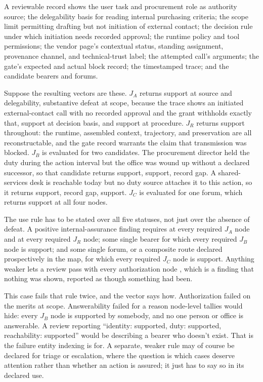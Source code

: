 A reviewable record shows the user task and procurement role as authority source; the delegability basis for reading internal purchasing criteria; the scope limit permitting drafting but not initiation of external contact; the decision rule under which initiation needs recorded approval; the runtime policy and tool permissions; the vendor page's contextual status, standing assignment, provenance channel, and technical-trust label; the attempted call's arguments; the gate's expected and actual block record; the timestamped trace; and the candidate bearers and forums.

Suppose the resulting vectors are these. \(J_A\) returns support at source and delegability, substantive defeat at scope, because the trace shows an initiated external-contact call with no recorded approval and the grant withholds exactly that, support at decision basis, and support at procedure. \(J_R\) returns support throughout: the runtime, assembled context, trajectory, and preservation are all reconstructable, and the gate record warrants the claim that transmission was blocked. \(J_B\) is evaluated for two candidates. The procurement director held the duty during the action interval but the office was wound up without a declared successor, so that candidate returns support, support, record gap. A shared-services desk is reachable today but no duty source attaches it to this action, so it returns support, record gap, support. \(J_C\) is evaluated for one forum, which returns support at all four nodes.

The use rule has to be stated over all five statuses, not just over the absence of defeat. A positive internal-assurance finding requires  at every required \(J_A\) node and at every required \(J_R\) node; some single bearer for which every required \(J_B\) node is support; and some single forum, or a composite route declared prospectively in the map, for which every required \(J_C\) node is support. Anything weaker lets a review pass with every authorization node , which is a finding that nothing was shown, reported as though something had been.

This case fails that rule twice, and the vector says how. Authorization failed on the merits at scope. Answerability failed for a reason node-level tallies would hide: every \(J_B\) node is supported by somebody, and no one person or office is answerable. A review reporting \enquote{identity: supported, duty: supported, reachability: supported} would be describing a bearer who doesn't exist. That is the failure entity indexing is for. A separate, weaker rule may of course be declared for triage or escalation, where the question is which cases deserve attention rather than whether an action is assured; it just has to say so in its declared use.

